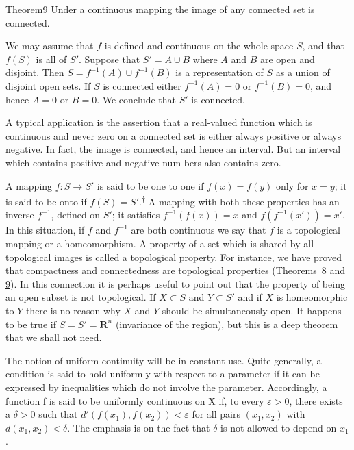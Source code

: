 \begin{originalstatement}{Theorem}{9}\label{thm:3.9}
Under a continuous mapping the image of any connected set is connected.
\end{originalstatement}
We may assume that $f$ is defined and continuous on the whole space $S$, and that $f(S)$ is all of $S'$. Suppose that $S' = A \cup B$ where $A$ and $B$ are open and disjoint. Then $S = f^{-1}(A) \cup f^{-1}(B)$ is a representation of $S$ as a union of disjoint open sets. If $S$ is connected either $f^{-1}(A) = 0$ or $f^{-1}(B) = 0$, and hence $A = 0$ or $B = 0$. We conclude that $S'$ is connected.

A typical application is the assertion that a real-valued function which is continuous and never zero on a connected set is either always positive or always negative. In fact, the image is connected, and hence an interval. But an interval which contains positive and negative num%
%
bers also contains zero.

A mapping $f: S \to S'$ is said to be one to one if $f(x) = f(y)$ only for $x = y$; it is said to be onto if $f(S) = S'$.\hyperlink{fn:81:dagger}{\textsuperscript{\ensuremath{\dagger}}} A mapping with both these properties has an inverse $f^{-1}$, defined on $S'$; it satisfies $f^{-1}(f(x)) = x$ and $f(f^{-1}(x')) = x'$. In this situation, if $f$ and $f^{-1}$ are both continuous we say that $f$ is a topological mapping or a homeomorphism. A property of a set which is shared by all topological images is called a topological property. For instance, we have proved that compactness and connectedness are topological properties (Theorems~\hyperref[thm:3.8]{8} and \hyperref[thm:3.9]{9}). In this connection it is perhaps useful to point out that the property of being an open subset is not topological. If $X \subset S$ and $Y \subset S'$ and if $X$ is homeomorphic to $Y$ there is no reason why $X$ and $Y$ should be simultaneously open. It happens to be true if $S = S' = \mathbf{R}^n$ (invariance of the region), but this is a deep theorem that we shall not need.

The notion of uniform continuity will be in constant use. Quite generally, a condition is said to hold uniformly with respect to a parameter if it can be expressed by inequalities which do not involve the parameter. Accordingly, a function f is said to be uniformly continuous on X if, to every $\varepsilon > 0$, there exists a $\delta > 0$ such that $d'(f(x_1), f(x_2)) < \varepsilon$ for all pairs $(x_1, x_2)$ with $d(x_1, x_2) < \delta$. The emphasis is on the fact that $\delta$ is not allowed to depend on $x_1$.

